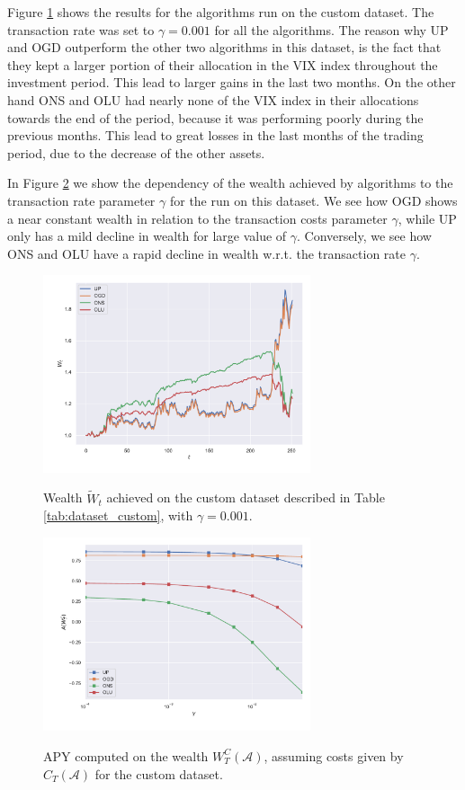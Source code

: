 Figure \ref{fig:wealth_custom} shows the results for the algorithms run on the custom dataset. The transaction rate was set to $\gamma=0.001$ for all the algorithms. The reason why UP and OGD outperform the other two algorithms in this dataset, is the fact that they kept a larger portion of their allocation in the VIX index throughout the investment period. This lead to larger gains in the last two months. On the other hand ONS and OLU had nearly none of the VIX index in their allocations towards the end of the period, because it was performing poorly during the previous months. This lead to great losses in the last months of the trading period, due to the decrease of the other assets. 

In Figure \ref{fig:costs_custom} we show the dependency of the wealth achieved by algorithms to the transaction rate parameter $\gamma$ for the run on this dataset. We see how OGD shows a near constant wealth in relation to the transaction costs parameter $\gamma$, while UP only has a mild decline in wealth for large value of $\gamma$. Conversely, we see how ONS and OLU have a rapid decline in wealth w.r.t. the transaction rate $\gamma$.

\begin{figure}[ht!]
\centering
{\includegraphics[width=0.70\textwidth,keepaspectratio]{img/new_experiemnts_1920.pdf}} 
\caption{Wealth $\tilde W_t$ achieved on the custom dataset described in Table \ref{tab:dataset_custom}, with $\gamma=0.001$.}
\label{fig:wealth_custom}
\end{figure}

\begin{figure}[ht!]
\centering
{\includegraphics[width=0.70\textwidth,keepaspectratio]{img/new_experiemnts_1920_costs.pdf}} 
\caption{APY computed on the wealth $W_T^C(\mathcal A)$, assuming costs given by $C_T(\mathcal A)$ for the custom dataset.}
\label{fig:costs_custom}
\end{figure}
